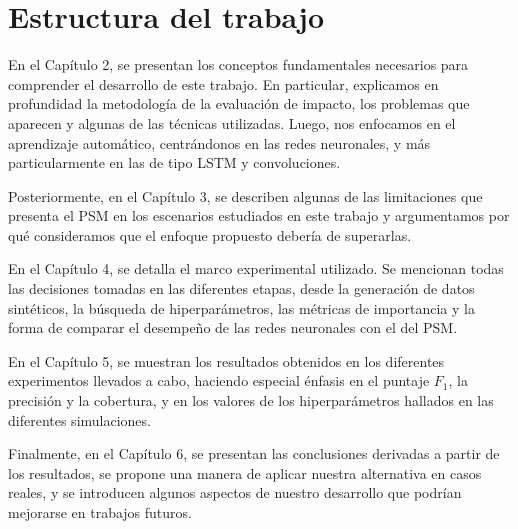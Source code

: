 \documentclass[../main.tex]{subfiles}
\begin{document}


\section{Estructura del trabajo}
En el Capítulo 2, se presentan los conceptos fundamentales necesarios para comprender el
desarrollo de este trabajo. En particular, explicamos en profundidad la metodología de la
evaluación de impacto, los problemas que aparecen y algunas de las técnicas utilizadas.
Luego, nos enfocamos en el aprendizaje automático, centrándonos en las redes neuronales, y
más particularmente en las de tipo LSTM y convoluciones.

Posteriormente, en el Capítulo 3, se describen algunas de las limitaciones que presenta el
PSM en los escenarios estudiados en este trabajo y argumentamos por qué consideramos que
el enfoque propuesto debería de superarlas.

En el Capítulo 4, se detalla el marco experimental utilizado. Se mencionan todas las
decisiones tomadas en las diferentes etapas, desde la generación de datos sintéticos, la
búsqueda de hiperparámetros, las métricas de importancia y la forma de comparar el
desempeño de las redes neuronales con el del PSM.

En el Capítulo 5, se muestran los resultados obtenidos en los diferentes experimentos
llevados a cabo, haciendo especial énfasis en el puntaje \(F_1\), la precisión y la
cobertura, y en los valores de los hiperparámetros hallados en las diferentes
simulaciones.

Finalmente, en el Capítulo 6, se presentan las conclusiones derivadas a partir de los
resultados, se propone una manera de aplicar nuestra alternativa en casos reales, y se
introducen algunos aspectos de nuestro desarrollo que podrían mejorarse en trabajos
futuros.
\end{document}
